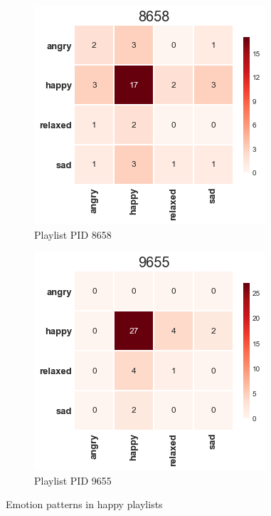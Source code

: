 \begin{figure}[H]
  \centering
  \begin{subfigure}[b]{0.49\linewidth}
    \includegraphics[width=\linewidth]{./chapters/chapter5/images/8658.png}
    \caption{Playlist PID 8658}
  \end{subfigure}
  \begin{subfigure}[b]{0.49\linewidth}
   \includegraphics[width=\linewidth]{./chapters/chapter5/images/9655.png}
    \caption{Playlist PID 9655}
  \end{subfigure}
  \caption{Emotion patterns in happy playlists}
  \label{fig:pattern2}
\end{figure}

